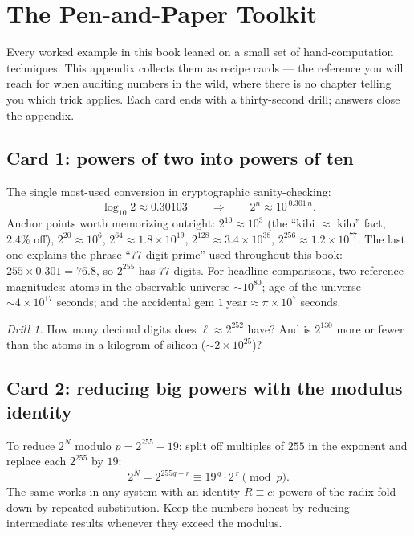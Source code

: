 \chapter{The Pen-and-Paper Toolkit}
\label{app:toolkit}

Every worked example in this book leaned on a small set of hand-computation
techniques. This appendix collects them as recipe cards --- the reference
you will reach for when auditing numbers in the wild, where there is no
chapter telling you which trick applies. Each card ends with a
thirty-second drill; answers close the appendix.

\section{Card 1: powers of two into powers of ten}

The single most-used conversion in cryptographic sanity-checking:
\[
\log_{10} 2 \approx 0.30103
\qquad\Longrightarrow\qquad
2^{n} \approx 10^{\,0.301\, n}.
\]
Anchor points worth memorizing outright: $2^{10} \approx 10^{3}$ (the
``kibi $\approx$ kilo'' fact, $2.4\%$ off), $2^{20} \approx 10^{6}$,
$2^{64} \approx 1.8 \times 10^{19}$, $2^{128} \approx 3.4 \times 10^{38}$,
$2^{256} \approx 1.2 \times 10^{77}$. The last one explains the phrase
``77-digit prime'' used throughout this book: $255 \times 0.301 = 76.8$,
so $2^{255}$ has $77$ digits. For headline comparisons, two reference
magnitudes: atoms in the observable universe $\sim 10^{80}$; age of the
universe $\sim 4 \times 10^{17}$ seconds; and the accidental gem
$1\ \text{year} \approx \pi \times 10^{7}$ seconds.

\emph{Drill 1.} How many decimal digits does $\ell \approx 2^{252}$ have?
And is $2^{130}$ more or fewer than the atoms in a kilogram of silicon
($\sim 2 \times 10^{25}$)?

\section{Card 2: reducing big powers with the modulus identity}

To reduce $2^{N}$ modulo $p = 2^{255} - 19$: split off multiples of
$255$ in the exponent and replace each $2^{255}$ by $19$:
\[
2^{N} = 2^{255 q + r} \equiv 19^{\,q} \cdot 2^{\,r} \pmod p .
\]
The same works in any system with an identity $R \equiv c$: powers of the
radix fold down by repeated substitution. Keep the numbers honest by
reducing intermediate results whenever they exceed the modulus.

